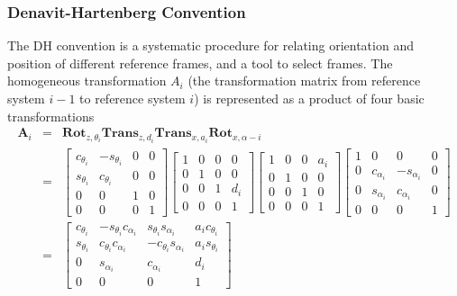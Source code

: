 \subsubsection{Denavit-Hartenberg Convention}
The DH convention is a systematic procedure for relating orientation and position of different reference frames, and a tool to select frames. The homogeneous transformation $A_i$ (the transformation matrix from reference system $i-1$ to reference system $i$) is represented as a product of four basic transformations 
\begin{eqnarray}
\boldsymbol{A}_i &=& \boldsymbol{Rot}_{z,\theta _i}\boldsymbol{Trans}_{z, d_i}\boldsymbol{Trans}_{x, a_i}\boldsymbol{Rot}_{x, \alpha -i}\nonumber\\
 &=& \begin{bmatrix}
c_{\theta _i} & -s_{\theta _i} & 0 & 0\\
s_{\theta _i} & c_{\theta _i} & 0 & 0\\
0 & 0 & 1 & 0\\
0 & 0 & 0 & 1
\end{bmatrix}
\begin{bmatrix}
1 & 0 & 0 & 0\\
0 & 1 & 0 & 0\\
0 & 0 & 1 & d_i\\
0 & 0 & 0 & 1
\end{bmatrix}
\begin{bmatrix}
1 & 0 & 0 & a_i\\
0 & 1 & 0 & 0\\
0 & 0 & 1 & 0\\
0 & 0 & 0 & 1
\end{bmatrix}
\begin{bmatrix}
1 & 0 & 0 & 0\\
0 & c_{\alpha _i} & -s_{\alpha _i} & 0\\
0 & s_{\alpha _i} & c_{\alpha _i} & 0\\
0 & 0 & 0 & 1
\end{bmatrix}\nonumber\\
&=& \begin{bmatrix}
c_{\theta _i} & -s_{\theta _i} c_{\alpha _i} & s_{\theta _i} s_{\alpha _i} & a_ic_{\theta _i}\\
s_{\theta _i} & c_{\theta _i} c_{\alpha _i} & -c_{\theta _i} s_{\alpha _i} & a_is_{\theta _i}\\
0 & s_{\alpha _i} & c_{\alpha _i} & d_i\\
0 & 0 & 0 & 1
\end{bmatrix}
\label{DH}
\end{eqnarray}
